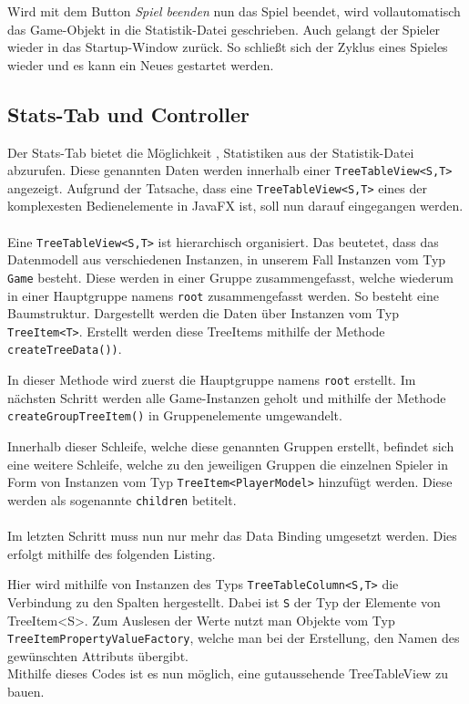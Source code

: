 Wird mit dem Button \textit{Spiel beenden} nun das Spiel beendet, wird vollautomatisch das Game-Objekt in die Statistik-Datei geschrieben.
Auch gelangt der Spieler wieder in das Startup-Window zurück.
So schließt sich der Zyklus eines Spieles wieder und es kann ein Neues gestartet werden.
\subsection{\acs{Stats}-Tab und Controller}\label{sssec:statsController}
Der Stats-Tab bietet die Möglichkeit , Statistiken aus der Statistik-Datei abzurufen.
Diese genannten Daten werden innerhalb einer \lstinline[style=java]{TreeTableView<S,T>} angezeigt.
Aufgrund der Tatsache, dass eine \lstinline[style=java]{TreeTableView<S,T>} eines der komplexesten Bedienelemente in JavaFX ist, soll nun darauf eingegangen werden.\\\\
Eine \lstinline[style=java]{TreeTableView<S,T>} ist hierarchisch organisiert.
Das beutetet, dass das Datenmodell aus verschiedenen Instanzen, in unserem Fall Instanzen vom Typ \lstinline[style=java]{Game} besteht.
Diese werden in einer Gruppe zusammengefasst, welche wiederum in einer Hauptgruppe namens \lstinline[style=java]{root} zusammengefasst werden.
So besteht eine Baumstruktur.
Dargestellt werden die Daten über Instanzen vom Typ \lstinline[style=java]{TreeItem<T>}.
Erstellt werden diese TreeItems mithilfe der Methode \lstinline[style=java]{createTreeData())}.

In dieser Methode wird zuerst die Hauptgruppe namens \lstinline[style=java]{root} erstellt.
Im nächsten Schritt werden alle Game-Instanzen geholt und mithilfe der Methode \lstinline[style=java]{createGroupTreeItem()} in Gruppenelemente umgewandelt.

Innerhalb dieser Schleife, welche diese genannten Gruppen erstellt, befindet sich eine weitere Schleife, welche zu den jeweiligen Gruppen die einzelnen Spieler in Form von Instanzen vom Typ \lstinline[style=java]{TreeItem<PlayerModel>} hinzufügt werden.
Diese werden als sogenannte \lstinline[style=java]{children} betitelt.\\\\
Im letzten Schritt muss nun nur mehr das Data Binding umgesetzt werden.
Dies erfolgt mithilfe des folgenden Listing.

Hier wird mithilfe von Instanzen des Typs \lstinline[style=java]{TreeTableColumn<S,T>} die Verbindung zu den Spalten hergestellt.
Dabei ist \lstinline[style=java]{S} der Typ der Elemente von {TreeItem<S>}.
Zum Auslesen der Werte nutzt man Objekte vom Typ \lstinline[style=java]{TreeItemPropertyValueFactory}, welche man bei der Erstellung, den Namen des gewünschten Attributs übergibt.\\
Mithilfe dieses Codes ist es nun möglich, eine gutaussehende TreeTableView zu bauen.
